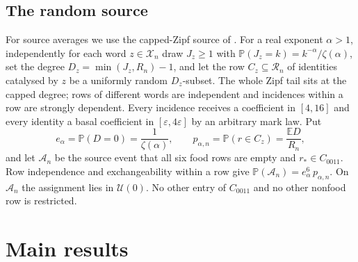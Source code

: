 \documentclass[11pt,letterpaper]{article}
\theoremstyle{plain}
\theoremstyle{definition}
\theoremstyle{remark}
\numberwithin{equation}{section}
\newcommand{\PP}{\mathbb P}
\newcommand{\EE}{\mathbb E}
\newcommand{\cX}{\mathcal X}
\newcommand{\cR}{\mathcal R}
\newcommand{\cU}{\mathcal U}
\newcommand{\eps}{\varepsilon}
\begin{document}
\subsection{The random source}\label{sec:sourcemodel}
For source averages we use the capped-Zipf source of \cite{twowindow2026}. For a real exponent $\alpha>1$, independently for each word $z\in\cX_n$ draw $J_z\ge1$ with $\PP(J_z=k)=k^{-\alpha}/\zeta(\alpha)$, set the degree $D_z=\min(J_z,R_n)-1$, and let the row $C_z\subseteq\cR_n$ of identities catalysed by $z$ be a uniformly random $D_z$-subset. The whole Zipf tail sits at the capped degree; rows of different words are independent and incidences within a row are strongly dependent. Every incidence receives a coefficient in $[4,16]$ and every identity a basal coefficient in $[\eps,4\eps]$ by an arbitrary mark law. Put
\begin{equation}\label{eq:sourceconstants}
 e_\alpha=\PP(D=0)=\frac1{\zeta(\alpha)},\qquad p_{\alpha,n}=\PP(r\in C_z)=\frac{\EE D}{R_n},
\end{equation}
and let $\mathcal A_n$ be the source event that all six food rows are empty and $r_*\in C_{0011}$. Row independence and exchangeability within a row give $\PP(\mathcal A_n)=e_\alpha^6\,p_{\alpha,n}$. On $\mathcal A_n$ the assignment lies in $\cU(0)$. No other entry of $C_{0011}$ and no other nonfood row is restricted.

\section{Main results}\label{sec:results}
\end{document}
